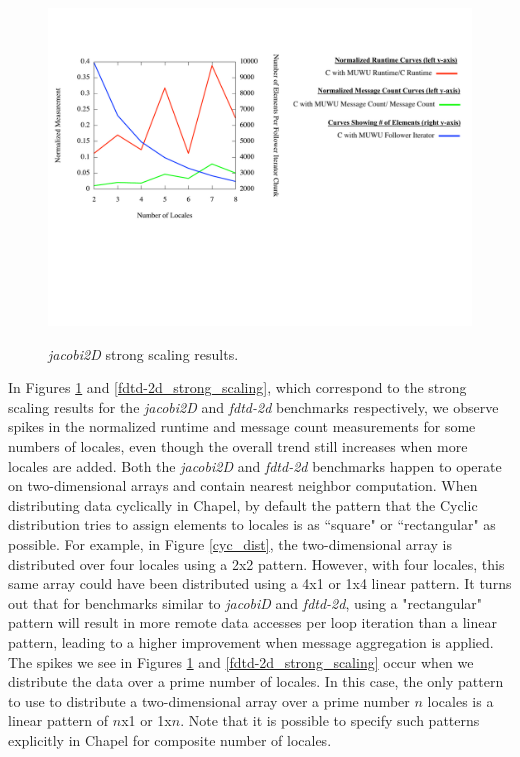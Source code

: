 \begin{figure}
\begin{center}
\includegraphics[width=\linewidth]{./Figures/strong_scaling/jacobi-2d.pdf}
\renewcommand{\baselinestretch}{1}
\small\normalsize
\begin{quote}
\caption[\textit{jacobi2D} strong scaling results]{\textit{jacobi2D} strong scaling results.\label{jacobi-2d_strong_scaling}}
\end{quote}
\end{center}
\end{figure}

In Figures \ref{jacobi-2d_strong_scaling} and \ref{fdtd-2d_strong_scaling}, which correspond to the strong scaling results for the \textit{jacobi2D} and \textit{fdtd-2d} benchmarks respectively, we observe spikes in the normalized runtime and message count measurements for some numbers of locales, even though the overall trend still increases when more locales are added. Both the \textit{jacobi2D} and \textit{fdtd-2d} benchmarks happen to operate on two-dimensional arrays and contain nearest neighbor computation. When distributing data cyclically in Chapel, by default the pattern that the Cyclic distribution tries to assign elements to locales is as ``square" or ``rectangular" as possible. For example, in Figure \ref{cyc_dist}, the two-dimensional array is distributed over four locales using a 2x2 pattern. However, with four locales, this same array could have been distributed using a 4x1 or 1x4 linear pattern. It turns out that for benchmarks similar to \textit{jacobiD} and \textit{fdtd-2d}, using a "rectangular" pattern will result in more remote data accesses per loop iteration than a linear pattern, leading to a higher improvement when message aggregation is applied. The spikes we see in Figures \ref{jacobi-2d_strong_scaling} and \ref{fdtd-2d_strong_scaling} occur when we distribute the data over a prime number of locales. In this case, the only pattern to use to distribute a two-dimensional array over a prime number $n$ locales is a linear pattern of $n$x1 or 1x$n$. Note that it is possible to specify such patterns explicitly in Chapel for composite number of locales. 

